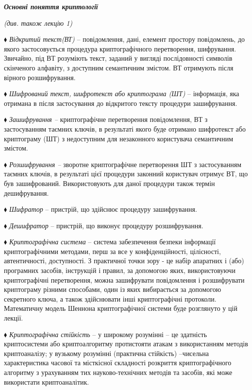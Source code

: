 \documentclass[a4paper]{article}
\newcounter{}
\begin{document}
\bigskip


\bigskip

{\centering\bfseries\itshape
Основні поняття криптології
\par}

{\centering\itshape
(див. також лекцію 1)
\par}


\bigskip


\bigskip

${\blacklozenge}$ \textit{Відкритий текст(ВТ)} – повідомлення, дані, елемент
простору повідомлень, до якого застосовується процедура криптографічного
перетворення, шифрування. Звичайно, під ВТ розуміють текст, заданий у вигляді
послідовності символів скінченого алфавіту, з доступним семантичним змістом. ВТ
отримують після вірного розшифрування.

${\blacklozenge}$ \textit{Шифрований текст, шифротекст  або криптограма (ШТ)} –
інформація, яка отримана в після застосування до відкритого тексту процедури
зашифрування.

${\blacklozenge}$ \textit{Зашифрування – }криптографічне перетворення
повідомлення, ВТ з застосуванням таємних ключів, в результаті якого буде
отримано \textit{ }шифротекст  або криптограму (ШТ) з недоступним для
незаконного користувача семантичним змістом.

${\blacklozenge}$ \textit{Розшифрування – }зворотне \textit{ }криптографічне
перетворення ШТ з застосуванням таємних ключів, в результаті цієї процедури
законний користувач отримує ВТ, що був зашифрований.  Використовують для даної
процедури також термін дешифрування.

${\blacklozenge}$ \textit{Шифратор }– пристрій, що здійснює процедуру
зашифрування.

${\blacklozenge}$ \textit{Дешифратор }– пристрій, що виконує процедуру
розшифрування.

${\blacklozenge}$ \textit{Криптографічна система }– система забезпечення безпеки
інформації криптографічними методами, перш за все у конфіденційності,
цілісності, автентичності, доступності. З практичної точки зору -  це набір
апаратних і (або) програмних засобів, інструкцій і правил, за допомогою яких,
використовуючи криптографічні перетворення, можна зашифрувати  повідомлення і
розшифрувати криптограму різними способами, один із яких вибирається за
допомогою секретного ключа, а також здійснювати інші криптографічні протоколи.
Математичну модель Шеннона криптографічної системи буде розглянуто у цій
лекції.

${\blacklozenge}$ \textit{Криптографічна стійкість }– у широкому розумінні – це
здатність криптосистеми або криптоалгоритму протистояти атакам з використанням
методів криптоаналізу; у вузькому розумінні (практична стійкість) –чисельна
характеристика часової та місткісної складності розкриття криптографічного
алгоритму з урахуванням тих науково-технічних методів та засобів, які може
використати криптоаналітик.
\end{document}
